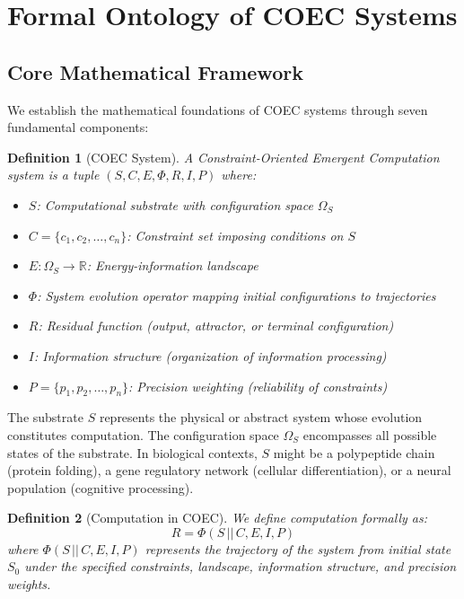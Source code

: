 \documentclass[11pt]{article}
\newtheorem{definition}{Definition}
\begin{document}
\section{Formal Ontology of COEC Systems}
\label{sec:ontology}

\subsection{Core Mathematical Framework}

We establish the mathematical foundations of COEC systems through seven fundamental components:

\begin{definition}[COEC System]
A Constraint-Oriented Emergent Computation system is a tuple $(S, C, E, \Phi, R, I, P)$ where:
\begin{itemize}
\item $S$: Computational substrate with configuration space $\Omega_S$
\item $C = \{c_1, c_2, \ldots, c_n\}$: Constraint set imposing conditions on $S$
\item $E: \Omega_S \to \mathbb{R}$: Energy-information landscape
\item $\Phi$: System evolution operator mapping initial configurations to trajectories
\item $R$: Residual function (output, attractor, or terminal configuration)
\item $I$: Information structure (organization of information processing)
\item $P = \{p_1, p_2, \ldots, p_n\}$: Precision weighting (reliability of constraints)
\end{itemize}
\end{definition}

The substrate $S$ represents the physical or abstract system whose evolution constitutes computation. The configuration space $\Omega_S$ encompasses all possible states of the substrate. In biological contexts, $S$ might be a polypeptide chain (protein folding), a gene regulatory network (cellular differentiation), or a neural population (cognitive processing).

\begin{definition}[Computation in COEC]
We define computation formally as:
\begin{equation}
R = \Phi(S \,||\, C, E, I, P)
\end{equation}
where $\Phi(S \,||\, C, E, I, P)$ represents the trajectory of the system from initial state $S_0$ under the specified constraints, landscape, information structure, and precision weights.
\end{definition}
\end{document}
